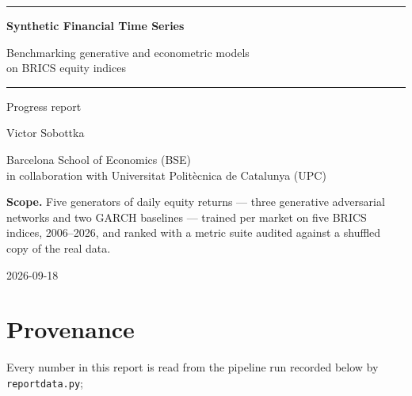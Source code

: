 \documentclass[11pt,a4paper]{article}
\makeatletter
\DeclareRobustCommand{\_}{\ifmmode\nfss@text{\textunderscore}\else\textunderscore\allowbreak\fi}
\makeatother
\begin{document}
\begin{titlepage}
\thispagestyle{empty}
\setlength{\parindent}{0pt}

\vspace*{3.2cm}
{\sffamily\color{Accent}\rule{\linewidth}{0.8pt}\par\vspace{0.9cm}
{\fontsize{30}{36}\selectfont\bfseries Synthetic Financial Time Series\par}
\vspace{0.5cm}
{\LARGE Benchmarking generative and econometric models\\[2pt] on BRICS equity indices\par}
\vspace{0.9cm}\rule{\linewidth}{0.8pt}\par}
\vspace{0.9cm}
{\sffamily\Large Progress report\par}
\vspace{2.6cm}
{\large Victor Sobottka\par}
\vspace{0.3cm}
{\normalsize Barcelona School of Economics (BSE)\\ in collaboration with Universitat Polit\`ecnica de Catalunya (UPC)\par}
\vfill
{\sffamily\small\textbf{Scope.} Five generators of daily equity returns --- three generative adversarial networks and two GARCH baselines --- trained per market on five BRICS indices, 2006--2026, and ranked with a metric suite audited against a shuffled copy of the real data.\par}
\vspace{0.7cm}
{\sffamily\small 2026-09-18\par}
\end{titlepage}
\setcounter{page}{2}

\tableofcontents
\clearpage

\section*{Provenance}
\label{sec:provenance}
Every number in this report is read from the pipeline run recorded below by \texttt{report\_data.py}; 
\end{document}
